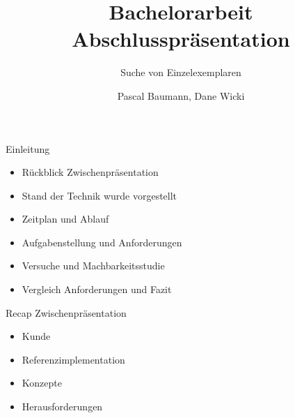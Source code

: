 \documentclass{beamer}
\title{Bachelorarbeit\\ Abschlusspräsentation}
\subtitle{Suche von Einzelexemplaren}
\author{Pascal Baumann, Dane Wicki}
\begin{document}
\begin{frame}[plain]
    \maketitle
\end{frame}
\begin{frame}{Einleitung}
\begin{itemize}
    \item Rückblick Zwischenpräsentation
    \item Stand der Technik wurde vorgestellt
    \item Zeitplan und Ablauf
    \item Aufgabenstellung und Anforderungen
    \item Versuche und Machbarkeitsstudie
    \item Vergleich Anforderungen und Fazit
\end{itemize}
\end{frame}
\begin{frame}{Recap Zwischenpräsentation}
\begin{itemize}
    \item Kunde
    \item Referenzimplementation
    \item Konzepte
    \item Herausforderungen
\end{itemize}
\end{frame}
\end{document}
